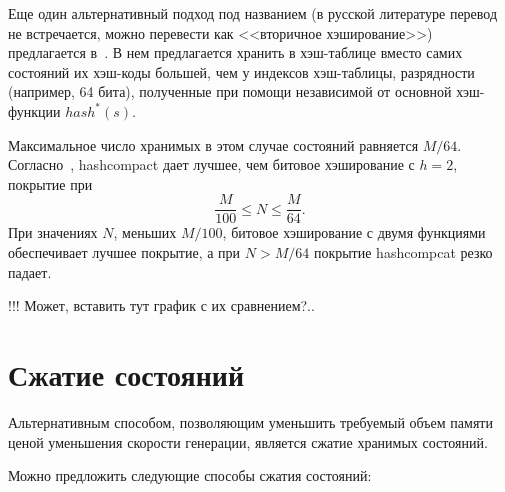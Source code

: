 Еще один альтернативный подход под названием  (в русской литературе
перевод не встречается, можно перевести как <<вторичное хэширование>>) предлагается
в~\cite{Wolper}. В нем предлагается хранить в хэш-таблице вместо самих состояний их
хэш-коды большей, чем у индексов хэш-таблицы, разрядности (например, 64 бита), полученные
при помощи независимой от основной хэш-функции $hash^*(s)$.

Максимальное число хранимых в этом случае состояний равняется
$M/64$. Согласно~\cite{BitHash1}, hashcompact дает лучшее, чем битовое хэширование с $h =
2$, покрытие при
\begin{equation}
  \label{eq:hashcompcat-coverage-optima}
  \frac{M}{100} \leq N \leq \frac{M}{64}.
\end{equation}
При значениях $N$, меньших $M/100$, битовое хэширование с двумя функциями обеспечивает
лучшее покрытие, а при $N > M/64$ покрытие hashcompcat резко падает.~\cite{Wolper}

!!! Может, вставить тут график с их сравнением?..

\section{Сжатие состояний}
\label{sec:state-compression}


Альтернативным способом, позволяющим уменьшить требуемый объем памяти ценой уменьшения
скорости генерации, является сжатие хранимых состояний.

Можно предложить следующие способы сжатия состояний:

